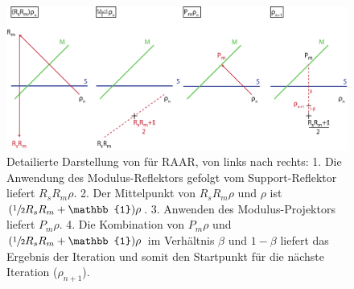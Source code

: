 \begin{figure}
	\centering
	\includegraphics[width=1\textwidth]{images/raar.pdf}
	\caption[RAAR]{Detailierte Darstellung von  für RAAR, von links nach rechts: 1. Die Anwendung des Modulus-Reflektors gefolgt vom Support-Reflektor liefert $R_sR_m\rho$. 2. Der Mittelpunkt von $R_sR_m\rho$ und $\rho$ ist $(\sfrac{1}{2}R_sR_m+\mathbb{1})\rho$. 3. Anwenden des Modulus-Projektors liefert $P_m\rho$. 4. Die Kombination von $P_m\rho$ und $(\sfrac{1}{2}R_sR_m+\mathbb{1})\rho$ im Verhältnis $\beta$ und $1-\beta$ liefert das Ergebnis der Iteration  und somit den Startpunkt für die nächste Iteration ($\rho_{n+1}$).}
	\label{fig:raar}
\end{figure} 	
